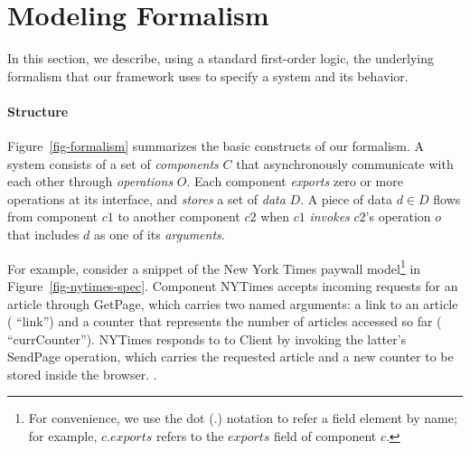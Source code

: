 \def\strlit#1{\textsf{\color{stringcolor} ``#1''}}
\def\cname#1{\textsf{#1}}
\def\mcom#1{{\color{comment} // #1}}
\def\txtstrlit#1{\strlit{\small #1}}
\def\txtcname#1{\cname{\small #1}}

\section{Modeling Formalism}
\label{sec-formalism}

In this section, we describe, using a standard first-order logic, the
underlying formalism that our framework uses to specify a system and
its behavior. 

\paragraph{\textbf{Structure}} Figure~\ref{fig-formalism} summarizes
the basic constructs of our formalism. A system consists of a set of
\textit{components} $C$ that asynchronously communicate with each
other through \textit{operations} $O$. Each component \textit{exports} zero or
more operations at its interface, and \textit{stores} a set of
\textit{data} $D$. A piece of data $d \in D$ flows from component $c1$
to another component $c2$ when $c1$ \textit{invokes} $c2$'s operation
$o$ that includes $d$ as one of its \textit{arguments}. 

For example, consider a snippet of the New York Times paywall
model\footnote{For convenience, we use the dot (.)  notation to refer
  a field element by name; for example, $c.exports$ refers to the
  $exports$ field of component $c$.} in
Figure~\ref{fig-nytimes-spec}. Component \txtcname{NYTimes} accepts
incoming requests for an article through \txtcname{GetPage}, which
carries two named arguments: a link to an article (\txtstrlit{link})
and a counter that represents the number of articles accessed so far
(\txtstrlit{currCounter}). \txtcname{NYTimes} responds to to
\txtcname{Client} by invoking the latter's \txtcname{SendPage} operation,
which carries the requested article and a new counter to be stored
inside the browser. .

